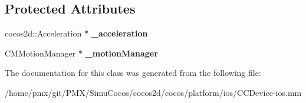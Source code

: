 \subsection*{Protected Attributes}
\begin{DoxyCompactItemize}
\item 
\mbox{\label{interfaceCCAccelerometerDispatcher_ac98d91ab7e537b5051031587262042de}} 
cocos2d\+::\+Acceleration $\ast$ {\bfseries \+\_\+acceleration}
\item 
\mbox{\label{interfaceCCAccelerometerDispatcher_ade6d29e19bca70a2fb276ecfa098dd4b}} 
C\+M\+Motion\+Manager $\ast$ {\bfseries \+\_\+motion\+Manager}
\end{DoxyCompactItemize}


The documentation for this class was generated from the following file\+:\begin{DoxyCompactItemize}
\item 
/home/pmx/git/\+P\+M\+X/\+Simu\+Cocos/cocos2d/cocos/platform/ios/C\+C\+Device-\/ios.\+mm\end{DoxyCompactItemize}

